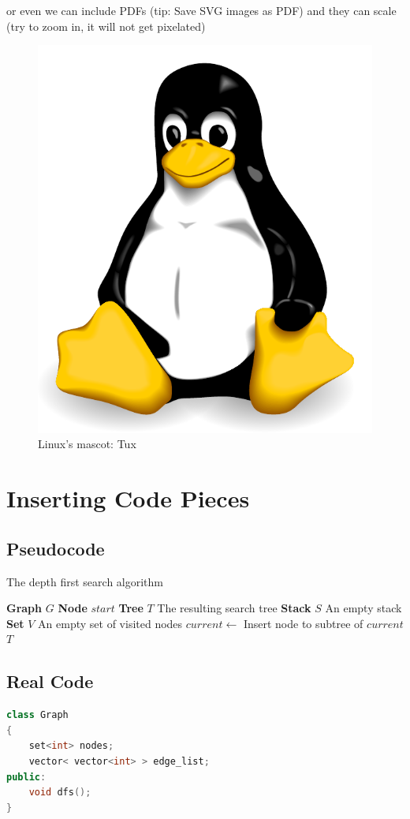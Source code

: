 \documentclass[a4paper, 12pt, titlepage]{article}
\begin{document}
or even we can include PDFs (tip: Save SVG images as PDF) and they can scale (try to zoom in, it will not get pixelated)

\begin{figure}[H]
	\centering
	\caption{Linux's mascot: Tux}
	\label{fig:tux}
	\includegraphics[width=.30\textwidth]{tux.pdf} %
\end{figure}

\newpage

\section{Inserting Code Pieces}
\subsection{Pseudocode}
\begin{algorithm}[H]
	\caption{The depth first search algorithm}
	\label{algo:dfs}
	\begin{algorithmic}
	\State \textbf{Graph} $G$
	\State \textbf{Node} $start$
		\State \textbf{Tree} $ T $ \Comment The resulting search tree
		\State \textbf{Stack} $ S $ \Comment An empty stack
		\State \textbf{Set} $ V $ \Comment An empty set of visited nodes
		\State {}
		\State {}
			\State $current \gets$  
				\State {}
					\State {}
					\State {} 
					\Comment Insert node to subtree of $ current $
				\EndFor
			\EndIf
		\EndWhile
		\State \Return $ T $
	\EndFunction
	\end{algorithmic}
\end{algorithm}

\subsection{Real Code}

\begin{lstlisting}[language=C++,caption=Depth first search in C++]
class Graph
{
	set<int> nodes;
	vector< vector<int> > edge_list;
public:
	void dfs();
}

\end{lstlisting}
\end{document}
